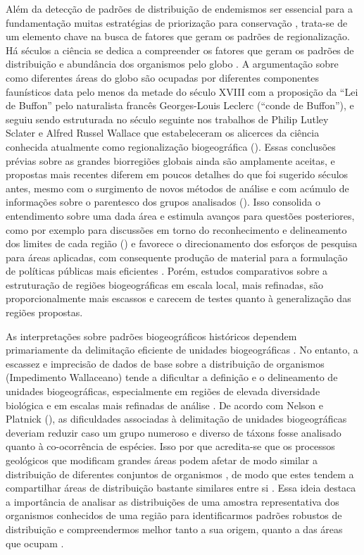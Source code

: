 \documentclass[12pt,openright,oneside,a4paper,english]{abntex2}
\begin{document}
Além da detecção de padrões de distribuição de endemismos ser essencial para a fundamentação muitas estratégias de priorização para conservação \citep{Brooks2006}, trata-se de um elemento chave na busca de fatores que geram os padrões de regionalização. Há séculos a ciência se dedica a compreender os fatores que geram os padrões de distribuição e abundância dos organismos pelo globo \citep{Brown1995}. A argumentação sobre como diferentes áreas do globo são ocupadas por diferentes componentes faunísticos data pelo menos da metade do século XVIII com a proposição da “Lei de Buffon” pelo naturalista francês Georges-Louis Leclerc (“conde de Buffon”), e seguiu sendo estruturada no século seguinte nos trabalhos de Philip Lutley Sclater e Alfred Russel Wallace que estabeleceram os alicerces da ciência conhecida atualmente como regionalização biogeográfica (\citealp[ver][]{Cox2016}). Essas conclusões prévias sobre as grandes biorregiões globais ainda são amplamente aceitas, e propostas mais recentes diferem em poucos detalhes do que foi sugerido séculos antes, mesmo com o surgimento de novos métodos de análise e com acúmulo de informações sobre o parentesco dos grupos analisados (\citealp[e.g.][]{Holt2013}). Isso consolida o entendimento sobre uma dada área e estimula avanços para questões posteriores, como por exemplo para discussões em torno do reconhecimento e delineamento dos limites de cada região (\citealp[e.g.][]{Ficetola2017, Morrone2018}) e favorece o direcionamento dos esforços de pesquisa para áreas aplicadas, com consequente produção de material para a formulação de políticas públicas mais eficientes \citep{Brooks2004, Whittaker2005}. Porém, estudos comparativos sobre a estruturação de regiões biogeográficas em escala local, mais refinadas, são proporcionalmente mais escassos e carecem de testes quanto à generalização das regiões propostas.

As interpretações sobre padrões biogeográficos históricos dependem primariamente da delimitação eficiente de unidades biogeográficas \citep{Hausdorf2002}. No entanto, a escassez e imprecisão de dados de base sobre a distribuição de organismos (Impedimento Wallaceano) tende a dificultar a definição e o delineamento de unidades biogeográficas, especialmente em regiões de elevada diversidade biológica \citep{Ficetola2014} e em escalas mais refinadas de análise \citep{Whittaker2005}. De acordo com Nelson e Platnick (\citeyear{Nelson1981}), as dificuldades associadas à delimitação de unidades biogeográficas deveriam reduzir caso um grupo numeroso e diverso de táxons fosse analisado quanto à co-ocorrência de espécies. Isso por que acredita-se que os processos geológicos que modificam grandes áreas podem afetar de modo similar a distribuição de diferentes conjuntos de organismos \citep{Wiley1988}, de modo que estes tendem a compartilhar áreas de distribuição bastante similares entre si \citep{Hausdorf2002}. Essa ideia destaca a importância de analisar as distribuições de uma amostra representativa dos organismos conhecidos de uma região para identificarmos padrões robustos de distribuição e compreendermos melhor tanto a sua origem, quanto a das áreas que ocupam \citep{Wiley1988, Morrone2002}.
\end{document}
